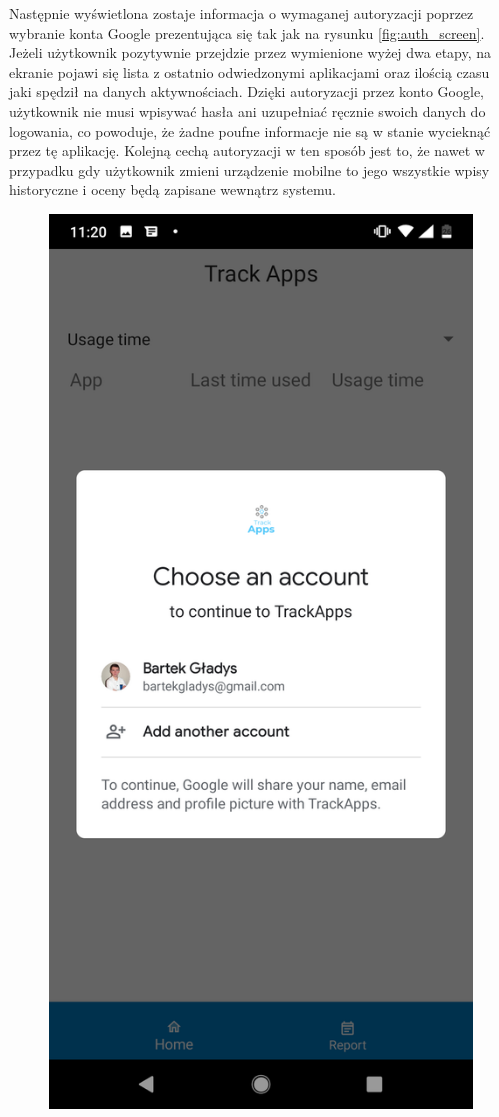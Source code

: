 \documentclass[a4paper,twoside,12pt]{book}
\begin{document}
Następnie wyświetlona zostaje informacja o wymaganej autoryzacji poprzez wybranie konta Google prezentująca się tak jak na rysunku \ref{fig:auth_screen}. Jeżeli użytkownik pozytywnie przejdzie przez wymienione wyżej dwa etapy, na ekranie pojawi się lista z ostatnio odwiedzonymi aplikacjami oraz ilością czasu jaki spędził na danych aktywnościach. Dzięki autoryzacji przez konto Google, użytkownik nie musi wpisywać hasła ani uzupełniać ręcznie swoich danych do logowania, co powoduje, że żadne poufne informacje nie są w stanie wycieknąć przez tę aplikację. Kolejną cechą autoryzacji w ten sposób jest to, że nawet w przypadku gdy użytkownik zmieni urządzenie mobilne to jego wszystkie wpisy historyczne i oceny będą zapisane wewnątrz systemu.

\begin{figure}[h!]
    \centering
    \includegraphics[scale=0.2]{images/account_screen.png}

\end{figure}
\end{document}
